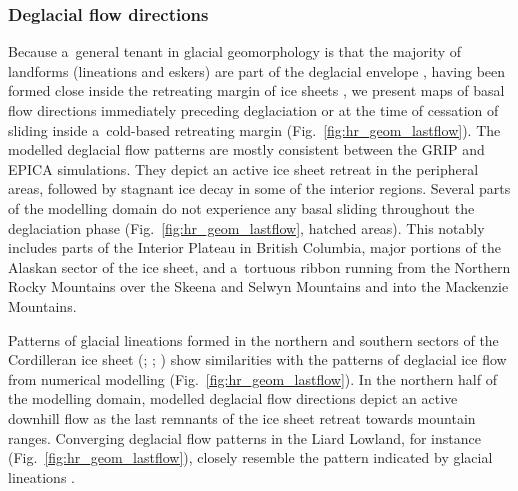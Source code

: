 \documentclass[tc, manuscript]{copernicus}
\begin{document}
\subsubsection{Deglacial flow directions}

      Because a~general tenant in glacial geomorphology is that the majority
      of landforms (lineations and eskers) are part of the deglacial
      envelope \citep[terminology from][]{Kleman.etal.2006}, having been
      formed close inside the retreating margin of ice sheets
      \citep{Boulton.Clark.1990, Kleman.etal.1997, Kleman.etal.2010}, we
      present maps of basal flow directions immediately preceding
      deglaciation or at the time of cessation of sliding inside
      a~cold-based retreating margin (Fig.~\ref{fig:hr_geom_lastflow}). The
      modelled deglacial flow patterns are mostly consistent between the
      GRIP and EPICA simulations. They depict an active ice sheet retreat in
      the peripheral areas, followed by stagnant ice decay in some of the
      interior regions. Several parts of the modelling domain do not
      experience any basal sliding throughout the deglaciation phase
      (Fig.~\ref{fig:hr_geom_lastflow}, hatched areas). This notably
      includes parts of the Interior Plateau in British Columbia, major
      portions of the Alaskan sector of the ice sheet, and a~tortuous ribbon
      running from the Northern Rocky Mountains over the Skeena and Selwyn
      Mountains and into the Mackenzie Mountains.

      Patterns of glacial lineations formed in the northern and southern
      sectors of the Cordilleran ice sheet (\citealp{Prest.etal.1968};
      \citealp[Fig.~1.12]{Clague.1989}; \citealp[Fig.~2]{Kleman.etal.2010})
      show similarities with the patterns of deglacial ice flow from
      numerical modelling (Fig.~\ref{fig:hr_geom_lastflow}). In the northern
      half of the modelling domain, modelled deglacial flow directions
      depict an active downhill flow as the last remnants of the ice sheet
      retreat towards mountain ranges. Converging deglacial flow patterns in
      the Liard Lowland, for instance (Fig.~\ref{fig:hr_geom_lastflow}),
      closely resemble the pattern indicated by glacial lineations
      \citep[Fig.~2]{Margold.etal.2013}.
\end{document}
